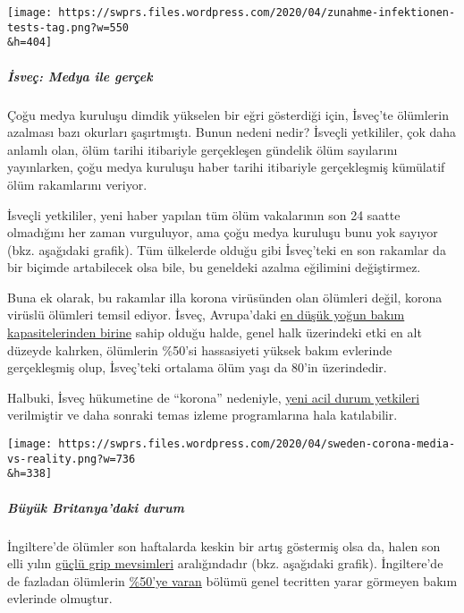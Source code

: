 \texttt{[image: https://swprs.files.wordpress.com/2020/04/zunahme-infektionen-tests-tag.png?w=550\\\&h=404]}

\hypertarget{isveuxe7-medya-ile-geruxe7ek}{%
\subparagraph{\texorpdfstring{\textbf{İsveç: Medya ile
gerçek}}{İsveç: Medya ile gerçek}}\label{isveuxe7-medya-ile-geruxe7ek}}

Çoğu medya kuruluşu dimdik yükselen bir eğri gösterdiği için, İsveç'te
ölümlerin azalması bazı okurları şaşırtmıştı. Bunun nedeni nedir?
İsveçli yetkililer, çok daha anlamlı olan, ölüm tarihi itibariyle
gerçekleşen gündelik ölüm sayılarını yayınlarken, çoğu medya kuruluşu
haber tarihi itibariyle gerçekleşmiş kümülatif ölüm rakamlarını veriyor.

İsveçli yetkililer, yeni haber yapılan tüm ölüm vakalarının son 24
saatte olmadığını her zaman vurguluyor, ama çoğu medya kuruluşu bunu yok
sayıyor (bkz. aşağıdaki grafik). Tüm ülkelerde olduğu gibi İsveç'teki en
son rakamlar da bir biçimde artabilecek olsa bile, bu geneldeki azalma
eğilimini değiştirmez.

Buna ek olarak, bu rakamlar illa korona virüsünden olan ölümleri değil,
korona virüslü ölümleri temsil ediyor. İsveç, Avrupa'daki
\href{https://link.springer.com/article/10.1007/s00134-012-2627-8}{en
düşük yoğun bakım kapasitelerinden birine} sahip olduğu halde, genel
halk üzerindeki etki en alt düzeyde kalırken, ölümlerin \%50'si
hassasiyeti yüksek bakım evlerinde gerçekleşmiş olup, İsveç'teki
ortalama ölüm yaşı da 80'in üzerindedir.

Halbuki, İsveç hükumetine de ``korona'' nedeniyle,
\href{https://www.tagesschau.de/faktenfinder/ausland/corona-kursaenderung-schweden-103.html}{yeni
acil durum yetkileri} verilmiştir ve daha sonraki temas izleme
programlarına hala katılabilir.

\texttt{[image: https://swprs.files.wordpress.com/2020/04/sweden-corona-media-vs-reality.png?w=736\\\&h=338]}

\hypertarget{buxfcyuxfck-britanyadaki-durum}{%
\subparagraph{\texorpdfstring{\textbf{Büyük Britanya'daki
durum}}{Büyük Britanya'daki durum}}\label{buxfcyuxfck-britanyadaki-durum}}

İngiltere'de ölümler son haftalarda keskin bir artış göstermiş olsa da,
halen son elli yılın \href{http://inproportion2.talkigy.com/}{güçlü grip
mevsimleri} aralığındadır (bkz. aşağıdaki grafik). İngiltere'de de
fazladan ölümlerin
\href{https://ltccovid.org/2020/04/12/mortality-associated-with-covid-19-outbreaks-in-care-homes-early-international-evidence/}{\%50'ye
varan} bölümü genel tecritten yarar görmeyen bakım evlerinde olmuştur.


